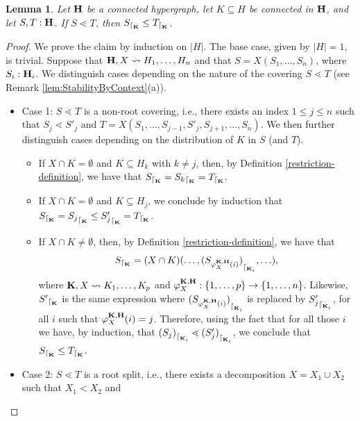 \documentclass{article}
\theoremstyle{plain}
\newtheorem{lemma}[thm]{Lemma}
\theoremstyle{definition}
\newcommand{\inc}{\subseteq}
\newcommand{\set}[1]{\{#1\}}
\newcommand{\hyper}[1]{{\bf #1}}
\newcommand{\restrconstr}[2]{{#1}_{\lceil_{#2}}}
\begin{document}
\begin{lemma} \label{restriction-order-comm}
Let ${\bf H}$ be a connected hypergraph, let $K\subseteq H$ be connected in ${\bf H}$, and let $S,T:{\bf H}$. If $S\lessdot T$, then $\restrconstr{S}{{\bf K}} \leq \restrconstr{T}{{\bf K}}$.
\end{lemma}
\begin{proof}
We prove the claim by induction on $|H|$. The base case, given by $|H|=1$, is trivial. Suppose that $\hyper{H},X\leadsto H_1,\ldots,H_n$ and that $S=X(S_1,\ldots,S_n)$, where $S_i:{\bf H}_i$. 
We distinguish cases depending on the nature of the covering $S\lessdot T$ (see Remark \ref{lem:StabilityByContext}(a)).

 \begin{itemize}
\item Case 1: $S\lessdot T$ is a non-root covering, i.e., there exists an index $1\leq j\leq n$ such that $S_j\lessdot S'_j$ and $T=X(S_1,\ldots,S_{j-1},S'_j,S_{j+1},\ldots,S_n)$. We then further distinguish cases depending on the distribution of $K$ in $S$ (and $T$).
\begin{itemize}
\item If $X\cap K=\emptyset$ and $K\inc H_k$ with $k\neq j$, then, by Definition \ref{restriction-definition}, we have that $\restrconstr{S}{{\bf K}}=\restrconstr{S_k}{{\bf K}}=
\restrconstr{T}{{\bf K}}$.
\item If $X\cap K=\emptyset$ and $K\inc H_j$, we conclude by induction that $\restrconstr{S}{{\bf K}}=\restrconstr{S_j}{{\bf K}}\leq \restrconstr{S'_j}{{\bf K}}=
\restrconstr{T}{{\bf K}}$.
\item If $X\cap K\neq\emptyset$, then, by Definition \ref{restriction-definition}, we have that
$$\restrconstr{S}{{\bf K}} =(X\cap K)(\ldots,\restrconstr{(S_{\varphi_X^{\hyper{K},\hyper{H}}(i)})}{\hyper{K}_i},\ldots),$$
where $\hyper{K},X \leadsto K_1,\ldots, K_p$ and $\varphi_X^{\hyper{K},\hyper{H}}:\set{1,\ldots,p}\rightarrow \set{1,\ldots,n}$. Likewise, $\restrconstr{S'}{{\bf K}}$ is the same expression where 
$\restrconstr{(S_{\varphi_X^{\hyper{K},\hyper{H}}(i)})}{\hyper{K}_i}$ is replaced by $\restrconstr{S'_j}{{\bf K}_i}$, 
for all $i$ such that $\varphi_X^{\hyper{K},\hyper{H}}(i)=j$. Therefore, using the fact that for all those $i$ we have, by induction, that
$\restrconstr{(S_j)}{\hyper{K}_i}\lessdot \restrconstr{(S'_j)}{\hyper{K}_i}$, we conclude that
$\restrconstr{S}{{\bf K}} \leq \restrconstr{T}{{\bf K}}$.
\end{itemize}
\item Case 2: $S\lessdot T$ is a root split, i.e., there exists a decomposition $X=X_1\cup X_2$ such that $X_1<X_2$ and

\end{itemize}
\end{proof}
\end{document}
